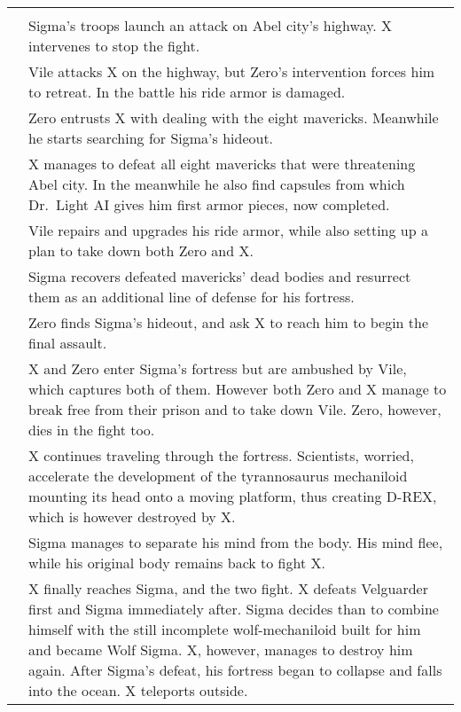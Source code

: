 \begin{tabularx}{\linewidth}{l X}
	\midrule
	\rowcolor{Aquamarine}
	\multicolumn{2}{c}{\textbf{Mega Man X}}\\
	\addlinespace[1.5ex]
	\tabdot& Sigma's troops launch an attack on Abel city's highway. X intervenes to stop the fight.\\
	\tabline& Vile attacks X on the highway, but Zero's intervention forces him to retreat. In the battle his ride armor is damaged.\\
	\tabdot& Zero entrusts X with dealing with the eight mavericks. Meanwhile he starts searching for Sigma's hideout.\\
	\tabdot& X manages to defeat all eight mavericks that were threatening Abel city. In the meanwhile he also find capsules from which Dr.~Light AI gives him first armor pieces, now completed.\\
	\tabdot& Vile repairs and upgrades his ride armor, while also setting up a plan to take down both Zero and X.\\
	\tabline& Sigma recovers defeated mavericks' dead bodies and resurrect them as an additional line of defense for his fortress.\\
	\tabdot& Zero finds Sigma's hideout, and ask X to reach him to begin the final assault.\\
	\tabdot& X and Zero enter Sigma's fortress but are ambushed by Vile, which captures both of them. However both Zero and X manage to break free from their prison and to take down Vile. Zero, however, dies in the fight too.\\
	\tabdot& X continues traveling through the fortress. Scientists, worried, accelerate the development of the tyrannosaurus mechaniloid mounting its head onto a moving platform, thus creating D-REX, which is however destroyed by X.\\
	\tabdot& Sigma manages to separate his mind from the body. His mind flee, while his original body remains back to fight X.\\
	\tabdot& X finally reaches Sigma, and the two fight. X defeats Velguarder first and Sigma immediately after. Sigma decides than to combine himself with the still incomplete wolf-mechaniloid built for him and became Wolf Sigma. X, however, manages to destroy him again. After Sigma's defeat, his fortress began to collapse and falls into the ocean. X teleports outside.\\
 	\midrule
\end{tabularx}